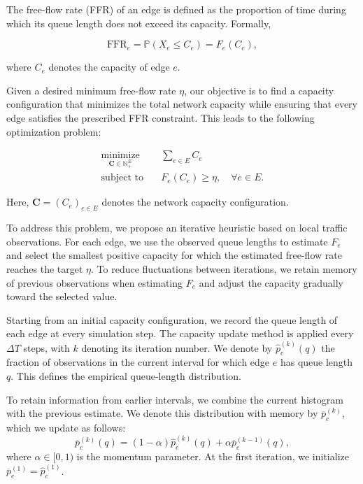 \documentclass[a4paper]{article}
\begin{document}
The free-flow rate (FFR) of an edge is defined as the
proportion of time during which its queue length does
not exceed its capacity. Formally,

\begin{equation}
    \mathrm{FFR}_e
    = \mathbb{P}(X_e \leq C_e)
    = F_e(C_e),
\end{equation}

\noindent
where $C_e$ denotes the capacity of edge $e$.

Given a desired minimum free-flow rate $\eta$, our
objective is to find a capacity configuration that
minimizes the total network capacity while ensuring
that every edge satisfies the prescribed FFR constraint.
This leads to the following optimization problem:

\begin{equation}
    \label{eq:optimization_problem}
    \begin{aligned}
        \underset{\mathbf{C} \in \mathbb{N}_+^{E}}
        {\text{minimize}}
        \quad & \sum_{e \in E} C_e \\
        \text{subject to}
        \quad & F_e(C_e) \geq \eta,
        \quad \forall e \in E.
    \end{aligned}
\end{equation}

\noindent
Here, $\mathbf{C} = (C_e)_{e \in E}$ denotes the
network capacity configuration.

To address this problem, we propose an iterative
heuristic based on local traffic observations. For each edge, we use
the observed queue lengths to estimate $F_e$ and select the smallest
positive capacity for which the estimated free-flow rate reaches
the target $\eta$. To reduce fluctuations between iterations, we
retain memory of previous observations when estimating $F_e$ and
adjust the capacity gradually toward the selected value.

Starting from an initial capacity configuration, we record the
queue length of each edge at every simulation step. The capacity
update method is applied every $\Delta T$ steps, with $k$ denoting its
iteration number. We denote by $\widehat{p}_e^{(k)}(q)$ the fraction of
observations in the current interval for which edge $e$ has queue
length $q$. This defines the empirical queue-length distribution.

To retain information from earlier intervals, we combine the current
histogram with the previous estimate. We denote this distribution
with memory by $\overline{p}_e^{(k)}$, which we update as follows:
\begin{equation}
    \overline{p}_e^{(k)}(q)
    = (1-\alpha)\widehat{p}_e^{(k)}(q) + \alpha \overline{p}_e^{(k-1)}(q) ,
\end{equation}
where $\alpha \in [0,1)$ is the momentum parameter. At the first
iteration, we initialize $\overline{p}_e^{(1)} = \widehat{p}_e^{(1)}$.
\end{document}
